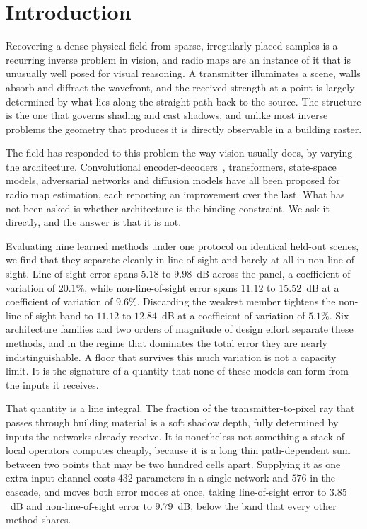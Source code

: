 \section{Introduction}
\label{sec:intro}

Recovering a dense physical field from sparse, irregularly placed samples is a
recurring inverse problem in vision, and radio maps are an instance of it that is
unusually well posed for visual reasoning. A transmitter illuminates a scene, walls
absorb and diffract the wavefront, and the received strength at a point is largely
determined by what lies along the straight path back to the source. The structure is
the one that governs shading and cast shadows, and unlike most inverse problems the
geometry that produces it is directly observable in a building raster.

The field has responded to this problem the way vision usually does, by varying the
architecture. Convolutional encoder-decoders~\cite{levie2021radiounet},
transformers, state-space models, adversarial networks and diffusion models have all
been proposed for radio map estimation, each reporting an improvement over the last.
What has not been asked is whether architecture is the binding constraint. We ask
it directly, and the answer is that it is not.

Evaluating nine learned methods under one protocol on identical held-out scenes, we
find that they separate cleanly in line of sight and barely at all in non line of
sight. Line-of-sight error spans $5.18$ to $9.98$~dB across the panel, a coefficient of
variation of $20.1\%$, while non-line-of-sight error spans $11.12$ to $15.52$~dB at a
coefficient of variation of $9.6\%$. Discarding the weakest member tightens the
non-line-of-sight band to $11.12$ to $12.84$~dB at a coefficient of variation of $5.1\%$. Six
architecture families and two orders of magnitude of design effort separate these
methods, and in the regime that dominates the total error they are nearly
indistinguishable. A floor that survives this much variation is not a capacity
limit. It is the signature of a quantity that none of these models can form from the
inputs it receives.

That quantity is a line integral. The fraction of the transmitter-to-pixel ray that
passes through building material is a soft shadow depth, fully determined by inputs
the networks already receive. It is nonetheless not something a stack of local
operators computes cheaply, because it is a long thin path-dependent sum between two
points that may be two hundred cells apart. Supplying it as one extra
input channel costs $432$ parameters in a single network and $576$ in the cascade,
and moves both error modes at once, taking line-of-sight error to $3.85$~dB and
non-line-of-sight error to $9.79$~dB, below the band that every other method
shares.

